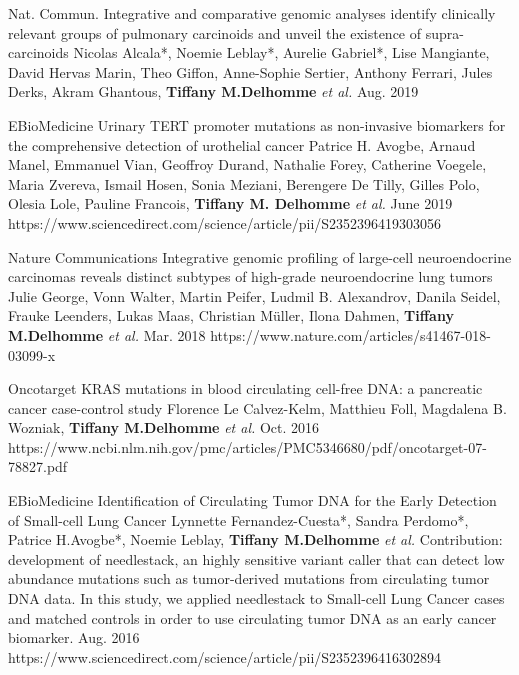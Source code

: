\begin{cventries}
    \cvpublicationentry
    {Nat. Commun.} %
    {Integrative and comparative genomic analyses identify clinically relevant groups of pulmonary carcinoids and unveil the existence of supra-carcinoids} %
    {Nicolas Alcala*, Noemie Leblay*, Aurelie Gabriel*, Lise Mangiante, David Hervas Marin, Theo Giffon, Anne-Sophie Sertier, Anthony Ferrari, Jules Derks, Akram Ghantous, \textbf{Tiffany M.Delhomme} \textit{et al.}} %
    {}
    {Aug. 2019} %
    {}

  \cvpublicationentry
    {EBioMedicine} %
    {Urinary TERT promoter mutations as non-invasive biomarkers for the comprehensive detection of urothelial cancer} %
    {Patrice H. Avogbe, Arnaud Manel, Emmanuel Vian, Geoffroy Durand, Nathalie Forey, Catherine Voegele, Maria Zvereva, Ismail Hosen, Sonia Meziani, Berengere De Tilly, Gilles Polo, Olesia Lole, Pauline Francois, \textbf{Tiffany M. Delhomme} \textit{et al.}} %
    {}
    {June 2019} %
    {https://www.sciencedirect.com/science/article/pii/S2352396419303056}

  \cvpublicationentry
    {Nature Communications} %
    {Integrative genomic profiling of large-cell neuroendocrine carcinomas reveals distinct subtypes of high-grade neuroendocrine lung tumors} %
    {Julie George, Vonn Walter, Martin Peifer, Ludmil B. Alexandrov, Danila Seidel, Frauke Leenders, Lukas Maas, Christian Müller, Ilona Dahmen, \textbf{Tiffany M.Delhomme} \textit{et al.}} %
    {}
    {Mar. 2018} %
    {https://www.nature.com/articles/s41467-018-03099-x}

  \cvpublicationentry
    {Oncotarget} %
    {KRAS mutations in blood circulating cell-free DNA: a pancreatic
cancer case-control study} %
    {Florence Le Calvez-Kelm, Matthieu Foll, Magdalena B. Wozniak, \textbf{Tiffany M.Delhomme} \textit{et al.}} %
    {}
    {Oct. 2016} %
    {https://www.ncbi.nlm.nih.gov/pmc/articles/PMC5346680/pdf/oncotarget-07-78827.pdf}

 
  \cvpublicationentry
    {EBioMedicine} %
    {Identification of Circulating Tumor DNA for the Early Detection of Small-cell Lung Cancer} %
    {Lynnette Fernandez-Cuesta*, Sandra Perdomo*, Patrice H.Avogbe*, Noemie Leblay, \textbf{Tiffany M.Delhomme} \textit{et al.}} %
    {Contribution: development of needlestack, an highly sensitive variant caller that can detect low abundance mutations such as tumor-derived mutations from circulating tumor DNA data. In this study, we applied needlestack to Small-cell Lung Cancer cases and matched controls in order to use circulating tumor DNA as an early cancer biomarker.}
    {Aug. 2016} %
    {https://www.sciencedirect.com/science/article/pii/S2352396416302894}



\end{cventries}
